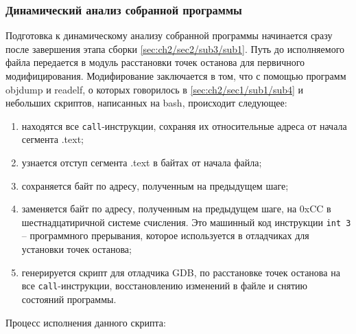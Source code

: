 \subsubsection{Динамический анализ собранной программы}\label{sec:ch2/sec2/sub3/sub3}
Подготовка к динамическому анализу собранной программы начинается сразу после завершения 
этапа сборки \autoref{sec:ch2/sec2/sub3/sub1}. Путь до исполняемого файла передается в модуль расстановки
точек останова для первичного модифицирования. Модифирование заключается в том, что с помощью
программ objdump и readelf, о которых говорилось в \autoref{sec:ch2/sec1/sub1/sub4} и
небольших скриптов, написанных на bash, происходит следующее: 
\begin{enumerate}[label={\arabic*)}]
    \item находятся все \texttt{call}-инструкции, сохраняя их относительные адреса от начала сегмента .text;
    \item узнается отступ сегмента .text в байтах от начала файла;
    \item сохраняется байт по адресу, полученным на предыдущем шаге;
    \item заменяется байт по адресу, полученным на предыдущем шаге, на 0xCC в шестнадцатиричной системе счисления.
        Это машинный код инструкции \texttt{int 3} -- программного прерывания, которое используется в отладчиках
        для установки точек останова;
    \item генерируется скрипт для отладчика GDB, по расстановке точек останова на все \texttt{call}-инструкции,
        восстановлению изменений в файле и снятию состояний программы.

\end{enumerate}
Процесс исполнения данного скрипта:
